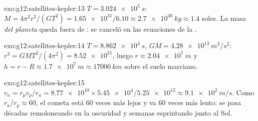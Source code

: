\begin{solution}{exo:g12:satellites-kepler:13}
$T = \qty{3.024e5}{s}$: $M = 4\pi^2 r^3/(GT^2) = \num{1.65e31}/6.10
\approx \qty{2.7e30}{kg} \approx 1.4$ soles. La masa \emph{del planeta}
queda fuera de : se canceló en las ecuaciones de la .
\end{solution}

\begin{solution}{exo:g12:satellites-kepler:14}
$T = \qty{8.862e4}{s}$, $GM = \qty{4.28e13}{m^3/s^2}$:
$r^3 = GMT^2/(4\pi^2) = \num{8.52e21}$, luego
$r \approx \qty{2.04e7}{m}$ y $h = r - R \approx \qty{1.7e7}{m} \approx
\qty{17000}{km}$ sobre el suelo marciano.
\end{solution}

\begin{solution}{exo:g12:satellites-kepler:15}
$v_a = r_p v_p / r_a = \num{8.77e10} \times \num{5.45e4} /
\num{5.25e12} \approx \qty{9.1e2}{m/s}$. Como $r_a/r_p \approx 60$, el
cometa está $60$ veces más lejos y va $60$ veces más lento: se pasa
décadas remoloneando en la oscuridad y semanas esprintando junto al Sol.
\end{solution}

